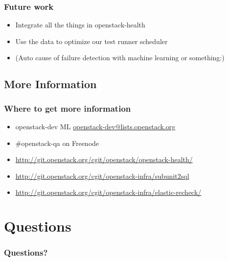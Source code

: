 \documentclass[aspectratio=43,11pt,hyperref={colorlinks=true}]{beamer}
\begin{document}
\begin{frame}
    \frametitle{Future work}
    \begin{itemize}
        \item Integrate all the things in openstack-health
        \item Use the data to optimize our test runner scheduler
        \item (Auto cause of failure detection with machine learning or something:)
    \end{itemize}
\end{frame}

\subsection{More Information}
\begin{frame}
\frametitle{Where to get more information}
    \begin{itemize}
        \item openstack-dev ML\: \href{mailto:openstack-dev@lists.openstack.org}{openstack-dev@lists.openstack.org}
        \item \#openstack-qa on Freenode
        \item \href{http://git.openstack.org/cgit/openstack/openstack-health/}{http://git.openstack.org/cgit/openstack/openstack-health/}
        \item \href{http://git.openstack.org/cgit/openstack-infra/subunit2sql}{http://git.openstack.org/cgit/openstack-infra/subunit2sql}
        \item \href{http://git.openstack.org/cgit/openstack-infra/elastic-recheck/}{http://git.openstack.org/cgit/openstack-infra/elastic-recheck/}
    \end{itemize}
\end{frame}

\section{Questions}
\begin{frame}
\frametitle{Questions?}
\end{frame}
\end{document}

